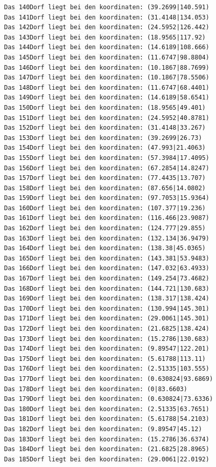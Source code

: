 \documentclass{article}
\begin{document}
\begin{verbatim}
Das 140Dorf liegt bei den koordinaten: (39.2699|140.591)
Das 141Dorf liegt bei den koordinaten: (31.4148|134.053)
Das 142Dorf liegt bei den koordinaten: (24.5952|126.442)
Das 143Dorf liegt bei den koordinaten: (18.9565|117.92)
Das 144Dorf liegt bei den koordinaten: (14.6189|108.666)
Das 145Dorf liegt bei den koordinaten: (11.6747|98.8804)
Das 146Dorf liegt bei den koordinaten: (10.1867|88.7699)
Das 147Dorf liegt bei den koordinaten: (10.1867|78.5506)
Das 148Dorf liegt bei den koordinaten: (11.6747|68.4401)
Das 149Dorf liegt bei den koordinaten: (14.6189|58.6541)
Das 150Dorf liegt bei den koordinaten: (18.9565|49.401)
Das 151Dorf liegt bei den koordinaten: (24.5952|40.8781)
Das 152Dorf liegt bei den koordinaten: (31.4148|33.267)
Das 153Dorf liegt bei den koordinaten: (39.2699|26.73)
Das 154Dorf liegt bei den koordinaten: (47.993|21.4063)
Das 155Dorf liegt bei den koordinaten: (57.3984|17.4095)
Das 156Dorf liegt bei den koordinaten: (67.2854|14.8247)
Das 157Dorf liegt bei den koordinaten: (77.4435|13.707)
Das 158Dorf liegt bei den koordinaten: (87.656|14.0802)
Das 159Dorf liegt bei den koordinaten: (97.7053|15.9364)
Das 160Dorf liegt bei den koordinaten: (107.377|19.236)
Das 161Dorf liegt bei den koordinaten: (116.466|23.9087)
Das 162Dorf liegt bei den koordinaten: (124.777|29.855)
Das 163Dorf liegt bei den koordinaten: (132.134|36.9479)
Das 164Dorf liegt bei den koordinaten: (138.38|45.0365)
Das 165Dorf liegt bei den koordinaten: (143.381|53.9483)
Das 166Dorf liegt bei den koordinaten: (147.032|63.4933)
Das 167Dorf liegt bei den koordinaten: (149.254|73.4682)
Das 168Dorf liegt bei den koordinaten: (144.721|130.683)
Das 169Dorf liegt bei den koordinaten: (138.317|138.424)
Das 170Dorf liegt bei den koordinaten: (130.994|145.301)
Das 171Dorf liegt bei den koordinaten: (29.0061|145.301)
Das 172Dorf liegt bei den koordinaten: (21.6825|138.424)
Das 173Dorf liegt bei den koordinaten: (15.2786|130.683)
Das 174Dorf liegt bei den koordinaten: (9.89547|122.201)
Das 175Dorf liegt bei den koordinaten: (5.61788|113.11)
Das 176Dorf liegt bei den koordinaten: (2.51335|103.555)
Das 177Dorf liegt bei den koordinaten: (0.630824|93.6869)
Das 178Dorf liegt bei den koordinaten: (0|83.6603)
Das 179Dorf liegt bei den koordinaten: (0.630824|73.6336)
Das 180Dorf liegt bei den koordinaten: (2.51335|63.7651)
Das 181Dorf liegt bei den koordinaten: (5.61788|54.2103)
Das 182Dorf liegt bei den koordinaten: (9.89547|45.12)
Das 183Dorf liegt bei den koordinaten: (15.2786|36.6374)
Das 184Dorf liegt bei den koordinaten: (21.6825|28.8965)
Das 185Dorf liegt bei den koordinaten: (29.0061|22.0192)

\end{verbatim}
\end{document}
